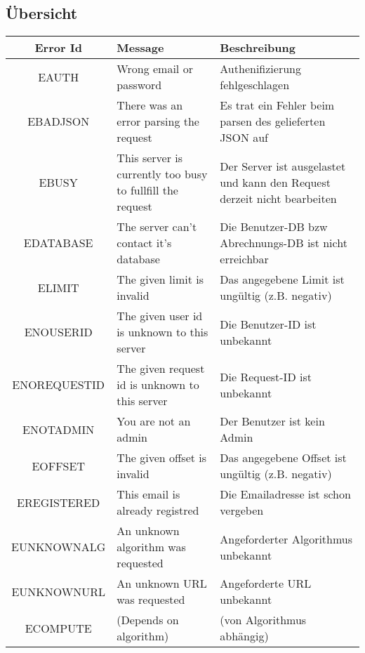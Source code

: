 \documentclass[ngerman,titlepage,parskip=true]{scrartcl}
\begin{document}
\subsection{Übersicht}
\begin{tabular}{|c|p{5cm}|p{5cm}|}
\hline
Error Id	& Message			& Beschreibung \\
\hline
EAUTH		& Wrong email or password	& Authenifizierung fehlgeschlagen \\
\hline
EBADJSON	& There was an error parsing the request & Es trat ein Fehler beim parsen des gelieferten JSON auf \\
\hline
EBUSY		& This server is currently too busy to fullfill the request	& Der Server ist ausgelastet und kann den Request derzeit nicht bearbeiten \\
\hline
EDATABASE	& The server can't contact it's database	& Die Benutzer-DB bzw Abrechnungs-DB ist nicht erreichbar \\
\hline
ELIMIT		& The given limit is invalid			& Das angegebene Limit ist ungültig (z.B. negativ) \\
\hline
ENOUSERID	& The given user id is unknown to this server	& Die Benutzer-ID ist unbekannt \\
\hline
ENOREQUESTID	& The given request id is unknown to this server	& Die Request-ID ist unbekannt \\
\hline
ENOTADMIN	& You are not an admin				& Der Benutzer ist kein Admin \\
\hline
EOFFSET		& The given offset is invalid 			& Das angegebene Offset ist ungültig (z.B. negativ) \\
\hline
EREGISTERED	& This email is already registred	& Die Emailadresse ist schon vergeben \\
\hline
EUNKNOWNALG	& An unknown algorithm was requested	& Angeforderter Algorithmus unbekannt \\
\hline
EUNKNOWNURL	& An unknown URL was requested	& Angeforderte URL unbekannt \\
\hline
ECOMPUTE	& (Depends on algorithm)	& (von Algorithmus abhängig) \\
\hline
\end{tabular}
\end{document}
